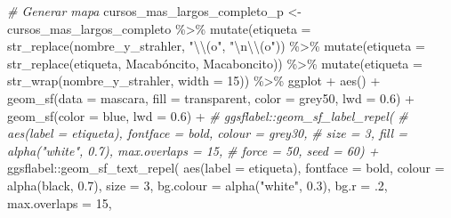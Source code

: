 \documentclass[spanish]{article}
\newenvironment{Shaded}{\begin{snugshade}}{\end{snugshade}}
\newcommand{\AttributeTok}[1]{\textcolor[rgb]{0.77,0.63,0.00}{#1}}
\newcommand{\CommentTok}[1]{\textcolor[rgb]{0.56,0.35,0.01}{\textit{#1}}}
\newcommand{\DecValTok}[1]{\textcolor[rgb]{0.00,0.00,0.81}{#1}}
\newcommand{\FloatTok}[1]{\textcolor[rgb]{0.00,0.00,0.81}{#1}}
\newcommand{\FunctionTok}[1]{\textcolor[rgb]{0.00,0.00,0.00}{#1}}
\newcommand{\NormalTok}[1]{#1}
\newcommand{\OtherTok}[1]{\textcolor[rgb]{0.56,0.35,0.01}{#1}}
\newcommand{\SpecialCharTok}[1]{\textcolor[rgb]{0.00,0.00,0.00}{#1}}
\newcommand{\StringTok}[1]{\textcolor[rgb]{0.31,0.60,0.02}{#1}}
\begin{document}
\begin{Shaded}
\begin{Highlighting}[]
\CommentTok{\# Generar mapa}
\NormalTok{cursos\_mas\_largos\_completo\_p }\OtherTok{\textless{}{-}}\NormalTok{ cursos\_mas\_largos\_completo }\SpecialCharTok{\%\textgreater{}\%} 
  \FunctionTok{mutate}\NormalTok{(}\AttributeTok{etiqueta =} \FunctionTok{str\_replace}\NormalTok{(nombre\_y\_strahler, }\StringTok{"}\SpecialCharTok{\textbackslash{}\textbackslash{}}\StringTok{(o"}\NormalTok{, }\StringTok{"}\SpecialCharTok{\textbackslash{}n\textbackslash{}\textbackslash{}}\StringTok{(o"}\NormalTok{)) }\SpecialCharTok{\%\textgreater{}\%}
  \FunctionTok{mutate}\NormalTok{(}\AttributeTok{etiqueta =} \FunctionTok{str\_replace}\NormalTok{(etiqueta, }\StringTok{\textquotesingle{}Macabóncito\textquotesingle{}}\NormalTok{, }\StringTok{\textquotesingle{}Macaboncito\textquotesingle{}}\NormalTok{)) }\SpecialCharTok{\%\textgreater{}\%} 
  \FunctionTok{mutate}\NormalTok{(}\AttributeTok{etiqueta =} \FunctionTok{str\_wrap}\NormalTok{(nombre\_y\_strahler, }\AttributeTok{width =} \DecValTok{15}\NormalTok{)) }\SpecialCharTok{\%\textgreater{}\%}
\NormalTok{  ggplot }\SpecialCharTok{+} \FunctionTok{aes}\NormalTok{() }\SpecialCharTok{+}
  \FunctionTok{geom\_sf}\NormalTok{(}\AttributeTok{data =}\NormalTok{ mascara, }\AttributeTok{fill =} \StringTok{\textquotesingle{}transparent\textquotesingle{}}\NormalTok{,}
          \AttributeTok{color =} \StringTok{\textquotesingle{}grey50\textquotesingle{}}\NormalTok{, }\AttributeTok{lwd =} \FloatTok{0.6}\NormalTok{) }\SpecialCharTok{+}
  \FunctionTok{geom\_sf}\NormalTok{(}\AttributeTok{color =} \StringTok{\textquotesingle{}blue\textquotesingle{}}\NormalTok{, }\AttributeTok{lwd =} \FloatTok{0.6}\NormalTok{) }\SpecialCharTok{+}
  \CommentTok{\# ggsflabel::geom\_sf\_label\_repel(}
  \CommentTok{\#   aes(label = etiqueta), fontface = \textquotesingle{}bold\textquotesingle{}, colour = \textquotesingle{}grey30\textquotesingle{}, }
  \CommentTok{\#   size = 3, fill = alpha("white", 0.7), max.overlaps = 15,}
  \CommentTok{\#   force = 50, seed = 60) +}
\NormalTok{  ggsflabel}\SpecialCharTok{::}\FunctionTok{geom\_sf\_text\_repel}\NormalTok{(}
    \FunctionTok{aes}\NormalTok{(}\AttributeTok{label =}\NormalTok{ etiqueta), }\AttributeTok{fontface =} \StringTok{\textquotesingle{}bold\textquotesingle{}}\NormalTok{, }\AttributeTok{colour =} \FunctionTok{alpha}\NormalTok{(}\StringTok{\textquotesingle{}black\textquotesingle{}}\NormalTok{, }\FloatTok{0.7}\NormalTok{), }
    \AttributeTok{size =} \DecValTok{3}\NormalTok{, }\AttributeTok{bg.colour =} \FunctionTok{alpha}\NormalTok{(}\StringTok{"white"}\NormalTok{, }\FloatTok{0.3}\NormalTok{), }\AttributeTok{bg.r =}\NormalTok{ .}\DecValTok{2}\NormalTok{, }\AttributeTok{max.overlaps =} \DecValTok{15}\NormalTok{,}

\end{Highlighting}
\end{Shaded}
\end{document}
